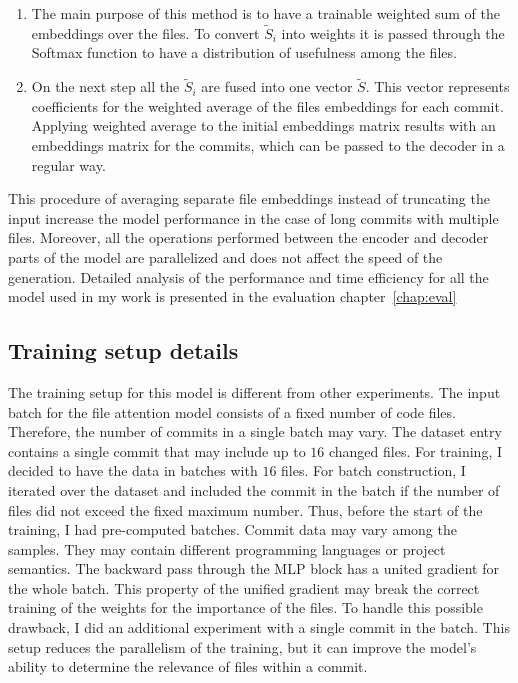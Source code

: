\begin{enumerate}
    \item The main purpose of this method is to have a trainable weighted sum of the embeddings over the files. To convert $\tilde{S}_i$ into weights it is passed through the Softmax function to have a distribution of usefulness among the files. 
    \item On the next step all the $\tilde{S}_i$ are fused into one vector $\tilde{S}$. This vector represents coefficients for the weighted average of the files embeddings for each commit. Applying weighted average to the initial embeddings matrix results with an embeddings matrix for the commits, which can be passed to the decoder in a regular way.   
\end{enumerate}
This procedure of averaging separate file embeddings instead of truncating the input increase the model performance in the case of long commits with multiple files. Moreover, all the operations performed between the encoder and decoder parts of the model are parallelized and does not affect the speed of the generation. Detailed analysis of the performance and time efficiency for all the model used in my work is presented in the evaluation chapter~\ref{chap:eval}

\subsection{Training setup details}
The training setup for this model is different from other experiments. The input batch for the file attention model consists of a fixed number of code files. Therefore, the number of commits in a single batch may vary. The dataset entry contains a single commit that may include up to $16$ changed files. For training, I decided to have the data in batches with $16$ files. For batch construction, I iterated over the dataset and included the commit in the batch if the number of files did not exceed the fixed maximum number. Thus, before the start of the training, I had pre-computed batches.
Commit data may vary among the samples. They may contain different programming languages or project semantics. The backward pass through the MLP block has a united gradient for the whole batch. This property of the unified gradient may break the correct training of the weights for the importance of the files. To handle this possible drawback, I did an additional experiment with a single commit in the batch. This setup reduces the parallelism of the training, but it can improve the model's ability to determine the relevance of files within a commit.

